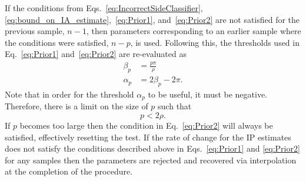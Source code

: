 \documentclass[a4paper]{IEEEtran}
\begin{document}
If the conditions from Eqs.~\ref{eq:IncorrectSideClassifier}, \ref{eq:bound_on_IA_estimate},~\ref{eq:Prior1}, and~\ref{eq:Prior2} are not satisfied for the previous sample, $n-1$, then parameters corresponding to an earlier sample where the conditions were satisfied, $n-p$, is used. Following this, the thresholds used in Eq.~\ref{eq:Prior1} and~\ref{eq:Prior2} are re-evaluated as
\begin{align}
	\beta_p &= \frac{p\pi}{\rho} \\
	\alpha_p &=2\beta_p-2\pi.
\end{align}
Note that in order for the threshold $\alpha_p$ to be useful, it must be negative. Therefore, there is a limit on the size of $p$ such that
\begin{equation}
	p < 2\rho.
\end{equation}
If $p$ becomes too large then the condition in Eq.~\ref{eq:Prior2} will always be satisfied, effectively resetting the test. If the rate of change for the IP estimates does not satisfy the conditions described above in Eqs.~\ref{eq:Prior1} and \ref{eq:Prior2} for any samples then the parameters are rejected and recovered via interpolation at the completion of the procedure.
\end{document}
